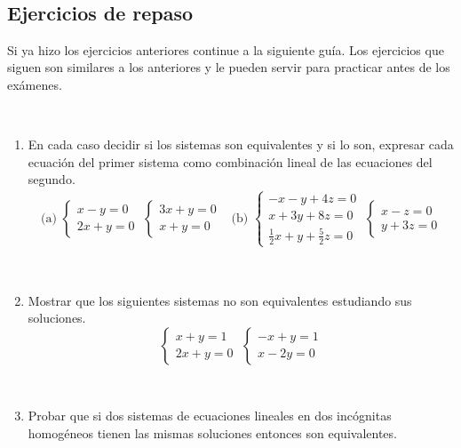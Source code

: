 \documentclass[12pt]{amsart}
\begin{document}
\

\subsection*{Ejercicios de repaso} Si ya hizo los ejercicios anteriores continue a la siguiente gu\'ia. Los ejercicios que siguen son similares a los anteriores y le pueden servir para practicar antes de los ex\'amenes.

\

\begin{enumerate}[resume]

\item En cada caso decidir si los sistemas son equivalentes y si lo son, expresar cada ecuaci\'on del primer sistema como combinaci\'on lineal de las ecuaciones del segundo.
$$\begin{array}{ll}
   \text{(a) } \begin{cases} x-y=0 \\ 2x+y=0 \end{cases} \;
     \begin{cases} 3x+y=0 \\ x+y=0 \end{cases}   &
  \text{(b) } \begin{cases} -x-y+4z=0 \\ x+3y+8z=0 \\ \tfrac{1}{2}x+y+\tfrac{5}{2}z=0 \end{cases} \;
    \begin{cases} x-z=0 \\ y+3z=0 \end{cases}
    \end{array}$$

\

\item Mostrar que los siguientes sistemas no son equivalentes estudiando sus soluciones.
\[
    \begin{cases} x+y=1 \\ 2x+y=0 \end{cases} \;
     \begin{cases} -x+y=1 \\ x-2y=0 \end{cases}  \]

\

\item Probar que si dos sistemas de ecuaciones lineales en dos inc\'ognitas homog\'eneos tienen las mismas soluciones entonces son equivalentes.


\end{enumerate}
\end{document}
